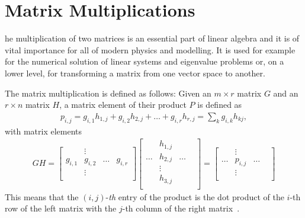%
%
\let\textcircled=\pgftextcircled
\chapter{Matrix Multiplications}
\label{chap:matmult}


he multiplication of two matrices is an essential part of linear algebra and it is of vital importance for all of modern physics and modelling. It is used for example for the numerical solution of linear systems and eigenvalue problems or, on a lower level, for transforming a matrix from one vector space to another.

The matrix multiplication is defined as follows: Given an $m\times r$ matrix $G$ and an $r \times n$ matrix $H$, a matrix element of their product $P$ is defined as 
\begin{align}
p_{i,j} = g_{i,1} h_{1,j} + g_{i,2} h_{2,j} + \hdots + g_{i,r} h_{r,j} = \sum_{k} g_{i,k} h_{kj}  ,
\end{align}
with matrix elements
\begin{align}
\label{equ:def_matmatmult}
GH = \begin{bmatrix}
           & \vdots &  &   \\    
    g_{i,1} & g_{i,2} & \hdots & g_{i,r} \\
       & \vdots &  &   \\    
\end{bmatrix}
\begin{bmatrix}
           & h_{1,j} &  &   \\    
  \hdots   & h_{2,j} & \hdots & \\
    & \vdots & \\
       & h_{3,j} &  &   \\    
\end{bmatrix} = 
\begin{bmatrix}
           & \vdots &  &   \\    
    \hdots & p_{i,j} & \hdots \\
       & \vdots &  &   \\    
\end{bmatrix}
\end{align}
This means that the $(i,j)$-\textit{th} entry of the product is the dot product of the $i$-th row of the left matrix with the $j$-th column of the right matrix~\cite{hefferon2012linear}. 

